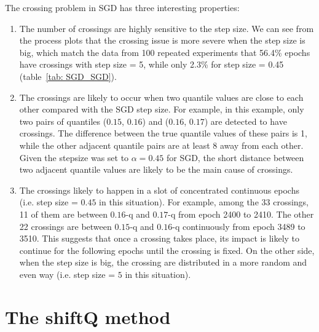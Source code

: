 The crossing problem in SGD has three interesting properties:
\begin{enumerate}

    \item The number of crossings are highly sensitive to the step size. We can see from the process plots that the crossing issue is more severe when the step size is big, which match the data from 100 repeated experiments that 56.4\% epochs have crossings with step size = 5, while only 2.3\% for step size = 0.45 (table~\ref{tab: SGD_SGD}).

    \item The crossings are likely to occur when two quantile values are close to each other compared with the SGD step size. For example, in this example, only two pairs of quantiles ($0.15$, $0.16$) and ($0.16$, $0.17$) are detected to have crossings. The difference between the true quantile values of these pairs is 1, while the other adjacent quantile pairs are at least 8 away from each other. Given the stepsize was set to $\alpha = 0.45$ for SGD, the short distance between two adjacent quantile values are likely to be the main cause of crossings.
    
    \item The crossings likely to happen in a slot of concentrated continuous epochs (i.e. step size = $0.45$ in this situation). For example, among the 33 crossings, 11 of them are between $0.16$-q and $0.17$-q from epoch 2400 to 2410. The other 22 crossings are between $0.15$-q and $0.16$-q continuously from epoch 3489 to 3510. This suggests that once a crossing takes place, its impact is likely to continue for the following epochs until the crossing is fixed. On the other side, when the step size is big, the crossing are distributed in a more random and even way (i.e. step size = $5$ in this situation).
    
\end{enumerate}

\section{The shiftQ method}
\label{sec: multi_shiftQ}

